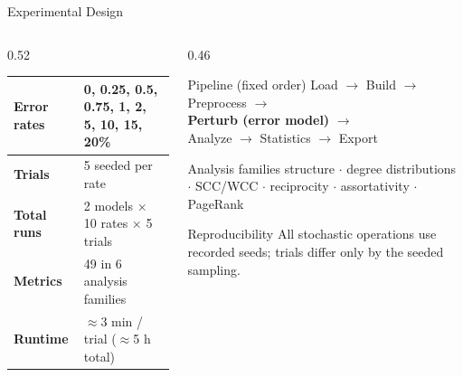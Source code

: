 \documentclass[aspectratio=169,11pt]{beamer}
\begin{document}
\begin{frame}{Experimental Design}
\begin{columns}[T]
  \begin{column}{0.52\textwidth}
    \footnotesize\renewcommand{\arraystretch}{1.3}
    \begin{tabular}{@{}ll@{}}
      \toprule
      \textbf{Error rates} & 0, 0.25, 0.5, 0.75, 1, 2, 5, 10, 15, 20\%\\
      \midrule
      \textbf{Trials} & 5 seeded per rate\\
      \textbf{Total runs} & 2 models $\times$ 10 rates $\times$ 5 trials\\
      \midrule
      \textbf{Metrics} & 49 in 6 analysis families\\
      \midrule
      \textbf{Runtime} & $\approx$3 min / trial ($\approx$5 h total)\\
      \bottomrule
    \end{tabular}
  \end{column}
  \begin{column}{0.46\textwidth}
    \begin{block}{Pipeline (fixed order)}
      \scriptsize
      Load $\rightarrow$ Build $\rightarrow$ Preprocess $\rightarrow$\\
      \quad\textbf{Perturb (error model)} $\rightarrow$\\
      Analyze $\rightarrow$ Statistics $\rightarrow$ Export
    \end{block}
    \begin{block}{Analysis families}
      \scriptsize
      structure $\cdot$ degree distributions $\cdot$ SCC/WCC $\cdot$
      reciprocity $\cdot$ assortativity $\cdot$ PageRank
    \end{block}
    \begin{block}{Reproducibility}
      \scriptsize
      All stochastic operations use recorded seeds; trials differ only by
      the seeded sampling.
    \end{block}
  \end{column}
\end{columns}
\end{frame}
\end{document}
